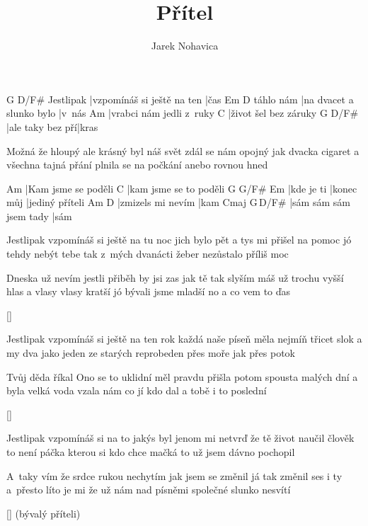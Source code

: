 \documentclass{song}
\author{Jarek Nohavica}
\title{Přítel}
\begin{document}
\begin{multicols}{2}

\strophe
          G                          D/F\#
Jestlipak |vzpomínáš si ještě na ten |čas
          Em\7                     D
táhlo nám |na dvacet a slunko bylo |v~nás
Am
|vrabci nám jedli z~ruky
C
|život šel bez záruky
G                D/F\#
|ale taky bez pří|kras
\endstrophe

\strophe*
Možná že hloupý ale krásný byl náš svět
zdál se nám opojný jak dvacka cigaret
a všechna tajná přání
plnila se na počkání
anebo rovnou hned
\endstrophe

Am
|Kam jsme se poděli
C
|kam jsme se to poděli
G          G/F\#      Em\7
|kde je ti |konec můj |jediný příteli
Am                D
|zmizels mi nevím |kam
Cmaj\7                 G\,D/F\#
|sám sám sám jsem tady |sám
\endstrophe

\strophe*
Jestlipak vzpomínáš si ještě na tu noc
jich bylo pět a tys mi přišel na pomoc
jó tehdy nebýt tebe
tak z~mých dvanácti žeber
nezůstalo příliš moc
\endstrophe

\strophe*
Dneska už nevím jestli přiběh by jsi zas
jak tě tak slyším máš už trochu vyšší hlas
a vlasy vlasy kratší
jó bývali jsme mladší
no a co vem to ďas
\endstrophe

\ref{}

\columnbreak

\strophe*
Jestlipak vzpomínáš si ještě na ten rok
každá naše píseň měla nejmíň třicet slok
a my dva jako jeden
ze starých reprobeden
přes moře jak přes potok
\endstrophe

\strophe*
Tvůj děda říkal Ono se to uklidní
měl pravdu přišla potom spousta malých dní
a byla velká voda
vzala nám co jí kdo dal
a tobě i to poslední
\endstrophe

\ref{}

\strophe*
Jestlipak vzpomínáš si na to jakýs byl
jenom mi netvrď že tě život naučil
člověk to není páčka
kterou si kdo chce mačká
to už jsem dávno pochopil
\endstrophe

\strophe*
A~taky vím že srdce rukou nechytím
jak jsem se změnil já tak změnil ses i ty
a~přesto líto je mi
že už nám nad písněmi
společné slunko nesvítí
\endstrophe

\ref{} (bývalý příteli)

\end{multicols}
\end{document}
